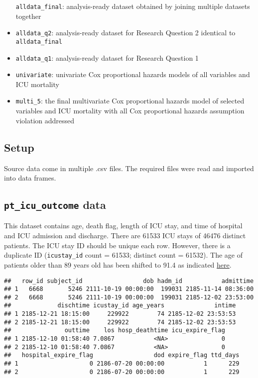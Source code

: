\documentclass[
]{article}
\begin{document}
\begin{itemize}
  \texttt{alldata\_final}: analysis-ready dataset obtained by joining
  multiple datasets together
\item
  \texttt{alldata\_q2}: analysis-ready dataset for Research Question 2
  identical to \texttt{alldata\_final}
\item
  \texttt{alldata\_q1}: analysis-ready dataset for Research Question 1
\item
  \texttt{univariate}: univariate Cox proportional hazards models of all
  variables and ICU mortality
\item
  \texttt{multi\_5}: the final multivariate Cox proportional hazards
  model of selected variables and ICU mortality with all Cox
  proportional hazards assumption violation addressed
\end{itemize}

\hypertarget{setup}{%
\subsection{Setup}\label{setup}}

Source data come in multiple .csv files. The required files were read
and imported into data frames.

\hypertarget{pt_icu_outcome-data}{%
\subsection{\texorpdfstring{\texttt{pt\_icu\_outcome}
data}{pt\_icu\_outcome data}}\label{pt_icu_outcome-data}}

This dataset contains age, death flag, length of ICU stay, and time of
hospital and ICU admission and discharge. There are 61533 ICU stays of
46476 distinct patients. The ICU stay ID should be unique each row.
However, there is a duplicate ID (\texttt{icustay\_id} count = 61533;
distinct count = 61532). The age of patients older than 89 years old has
been shifted to 91.4 as indicated
\href{https://mimic.mit.edu/docs/iii/tables/patients/}{here}.

\begin{verbatim}
##   row_id subject_id                 dob hadm_id           admittime
## 1   6668       5246 2111-10-19 00:00:00  199031 2185-11-14 08:36:00
## 2   6668       5246 2111-10-19 00:00:00  199031 2185-12-02 23:53:00
##             dischtime icustay_id age_years              intime
## 1 2185-12-21 18:15:00     229922        74 2185-12-02 23:53:53
## 2 2185-12-21 18:15:00     229922        74 2185-12-02 23:53:53
##               outtime    los hosp_deathtime icu_expire_flag
## 1 2185-12-10 01:58:40 7.0867           <NA>               0
## 2 2185-12-10 01:58:40 7.0867           <NA>               0
##   hospital_expire_flag                 dod expire_flag ttd_days
## 1                    0 2186-07-20 00:00:00           1      229
## 2                    0 2186-07-20 00:00:00           1      229
\end{verbatim}
\end{document}
